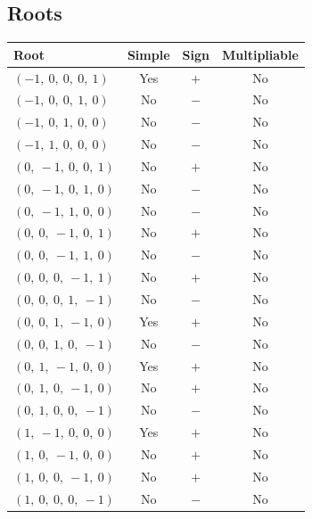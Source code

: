 \documentclass[11pt]{article}
\theoremstyle{definition}
\begin{document}
\subsection{Roots}

\begin{tabular}{|l|c|c|c|}
    \hline
    \textbf{Root} & \textbf{Simple} & \textbf{Sign} & \textbf{Multipliable} \\
    \hline
    $\left( -1, \  0, \  0, \  0, \  1\right)$ & Yes & $+$ & No \\
    \hline
    $\left( -1, \  0, \  0, \  1, \  0\right)$ & No & $-$ & No \\
    \hline
    $\left( -1, \  0, \  1, \  0, \  0\right)$ & No & $-$ & No \\
    \hline
    $\left( -1, \  1, \  0, \  0, \  0\right)$ & No & $-$ & No \\
    \hline
    $\left( 0, \  -1, \  0, \  0, \  1\right)$ & No & $+$ & No \\
    \hline
    $\left( 0, \  -1, \  0, \  1, \  0\right)$ & No & $-$ & No \\
    \hline
    $\left( 0, \  -1, \  1, \  0, \  0\right)$ & No & $-$ & No \\
    \hline
    $\left( 0, \  0, \  -1, \  0, \  1\right)$ & No & $+$ & No \\
    \hline
    $\left( 0, \  0, \  -1, \  1, \  0\right)$ & No & $-$ & No \\
    \hline
    $\left( 0, \  0, \  0, \  -1, \  1\right)$ & No & $+$ & No \\
    \hline
    $\left( 0, \  0, \  0, \  1, \  -1\right)$ & No & $-$ & No \\
    \hline
    $\left( 0, \  0, \  1, \  -1, \  0\right)$ & Yes & $+$ & No \\
    \hline
    $\left( 0, \  0, \  1, \  0, \  -1\right)$ & No & $-$ & No \\
    \hline
    $\left( 0, \  1, \  -1, \  0, \  0\right)$ & Yes & $+$ & No \\
    \hline
    $\left( 0, \  1, \  0, \  -1, \  0\right)$ & No & $+$ & No \\
    \hline
    $\left( 0, \  1, \  0, \  0, \  -1\right)$ & No & $-$ & No \\
    \hline
    $\left( 1, \  -1, \  0, \  0, \  0\right)$ & Yes & $+$ & No \\
    \hline
    $\left( 1, \  0, \  -1, \  0, \  0\right)$ & No & $+$ & No \\
    \hline
    $\left( 1, \  0, \  0, \  -1, \  0\right)$ & No & $+$ & No \\
    \hline
    $\left( 1, \  0, \  0, \  0, \  -1\right)$ & No & $-$ & No \\
    \hline
\end{tabular}
\end{document}
